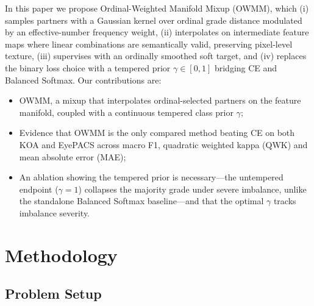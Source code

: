 \documentclass[runningheads]{svproc}
\begin{document}
In this paper we propose Ordinal-Weighted Manifold Mixup (OWMM), which (i) samples partners with a Gaussian kernel over ordinal grade distance modulated by an effective-number frequency weight, (ii) interpolates on intermediate feature maps where linear combinations are semantically valid, preserving pixel-level texture, (iii) supervises with an ordinally smoothed soft target, and (iv) replaces the binary loss choice with a tempered prior $\gamma\in[0,1]$ bridging CE and Balanced Softmax. Our contributions are:

\begin{itemize}
  \item OWMM, a mixup that interpolates ordinal-selected partners on the feature manifold, coupled with a continuous tempered class prior $\gamma$;
  \item Evidence that OWMM is the only compared method beating CE on both KOA and EyePACS across macro F1, quadratic weighted kappa (QWK) and mean absolute error (MAE);
  \item An ablation showing the tempered prior is necessary---the untempered endpoint ($\gamma=1$) collapses the majority grade under severe imbalance, unlike the standalone Balanced Softmax baseline---and that the optimal $\gamma$ tracks imbalance severity.
\end{itemize}


\section{Methodology}

\subsection{Problem Setup}
\end{document}
